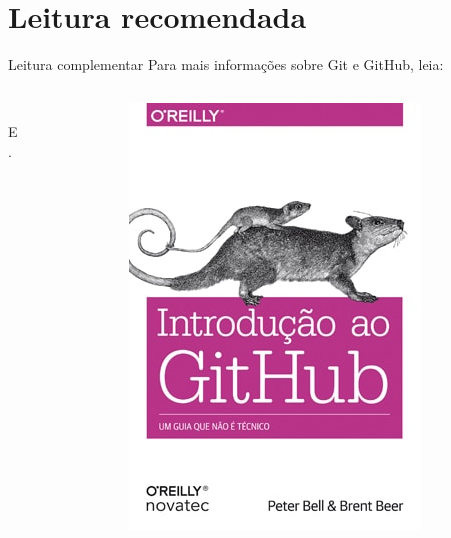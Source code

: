 \documentclass{beamer}
\begin{document}
\section{Leitura recomendada}
\begin{frame}{Leitura complementar}
 Para mais informações sobre Git e GitHub, leia:\\
  \vspace{0.6cm}
 \begin{columns}
   \begin{column}{0.4\textwidth}
 \cite{githubpages2022}\\
 E\\
 \cite{beer2015github}.
   \end{column}
   \begin{column}{0.4\textwidth}
    \includegraphics[height=0.7\paperheight]{fig/aula3/introgit.jpg} \\
   \end{column}

 \end{columns}
\end{frame}
\end{document}

